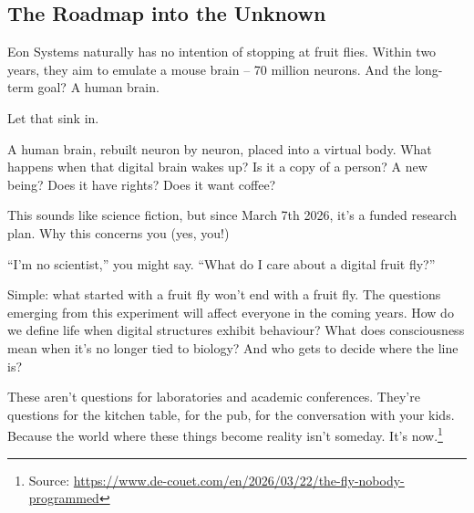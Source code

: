 \documentclass[10pt,a4paper]{article}
\newcommand{\source}[1]{\footnote{Source: \href{#1}{#1}}}
\begin{document}
\subsection{The Roadmap into the Unknown}

Eon Systems naturally has no intention of stopping at fruit flies. Within two years, they aim to emulate a mouse brain – 70 million neurons. And the long-term goal? A human brain.

Let that sink in.

A human brain, rebuilt neuron by neuron, placed into a virtual body. What happens when that digital brain wakes up? Is it a copy of a person? A new being? Does it have rights? Does it want coffee?

This sounds like science fiction, but since March 7th 2026, it’s a funded research plan.
Why this concerns you (yes, you!)

“I’m no scientist,” you might say. “What do I care about a digital fruit fly?”

Simple: what started with a fruit fly won’t end with a fruit fly. The questions emerging from this experiment will affect everyone in the coming years. How do we define life when digital structures exhibit behaviour? What does consciousness mean when it’s no longer tied to biology? And who gets to decide where the line is?

These aren’t questions for laboratories and academic conferences. They’re questions for the kitchen table, for the pub, for the conversation with your kids. Because the world where these things become reality isn’t someday. It’s now.\source{https://www.de-couet.com/en/2026/03/22/the-fly-nobody-programmed}
\end{document}
